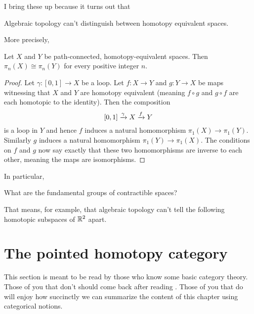 I bring these up because it turns out that 
\begin{moral}
	Algebraic topology can't distinguish between homotopy equivalent spaces.
\end{moral}
More precisely,
\begin{theorem}
	\label{thm:fundgrp_homotopy_invariant}
	Let $X$ and $Y$ be path-connected, homotopy-equivalent spaces.
	Then $\pi_n(X) \cong \pi_n(Y)$ for every positive integer $n$.
\end{theorem}
\begin{proof}
	Let $\gamma : [0,1] \to X$ be a loop.
	Let $f : X \to Y$ and $g : Y \to X$ be maps witnessing that $X$ and $Y$ are homotopy equivalent
	(meaning $f \circ g$ and $g \circ f$ are each homotopic to the identity).
	Then the composition
	\[ [0,1] \xrightarrow{\gamma} X \xrightarrow{f} Y \]
	is a loop in $Y$ and hence $f$ induces a natural homomorphism $\pi_1(X) \to \pi_1(Y)$.
	Similarly $g$ induces a natural homomorphism $\pi_1(Y) \to \pi_1(X)$.
	The conditions on $f$ and $g$ now say exactly that these two homomorphisms
	are inverse to each other, meaning the maps are isomorphisms.
\end{proof}
In particular,
\begin{ques}
	What are the fundamental groups of contractible spaces?
\end{ques}

That means, for example, that algebraic topology can't tell
the following homotopic subspaces of $\mathbb R^2$ apart.
\begin{center}
	{\color{red} \Huge \venus}
	\qquad
	{\color{blue} \Huge \mars}
\end{center}

\section{The pointed homotopy category}
This section is meant to be read by those who know some basic category theory.
Those of you that don't should come back after reading .
Those of you that do will enjoy how succinctly we can summarize
the content of this chapter using categorical notions.


